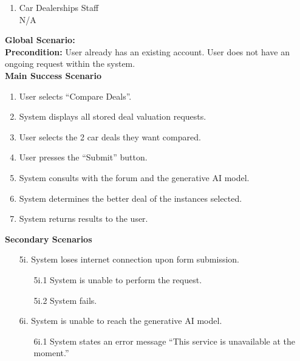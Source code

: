 \documentclass[]{article}
\begin{document}
\begin{enumerate}[{\bf {BE}1.}]
\begin{enumerate}[{\bf VP1.}]
		  \item Car Dealerships Staff \\ N/A
		\end{enumerate}
		{\bf Global Scenario:}\\
		\textbf{Precondition:} User already has an existing account. User does not have an ongoing request within the system.\\
		\textbf{Main Success Scenario}
		\begin{enumerate}[1.]
		  \item User selects ``Compare Deals''.
		  \item System displays all stored deal valuation requests.
		  \item User selects the 2 car deals they want compared.
		  \item User presses the ``Submit'' button.
		  \item System consults with the forum and the generative AI model.
		  \item System determines the better deal of the instances selected.
		  \item System returns results to the user.
		\end{enumerate}
		\textbf{Secondary Scenarios}
		\begin{enumerate}
		  \item[5i.] System loses internet connection upon form submission.
		  \begin{enumerate}
			\item[5i.1] System is unable to perform the request.
			\item[5i.2] System fails.
		  \end{enumerate}
		  \item[6i.] System is unable to reach the generative AI model.
		  \begin{enumerate}
			\item[6i.1] System states an error message ``This service is unavailable at the moment.''
		  \end{enumerate}
		\end{enumerate}


\end{enumerate}
\end{document}
